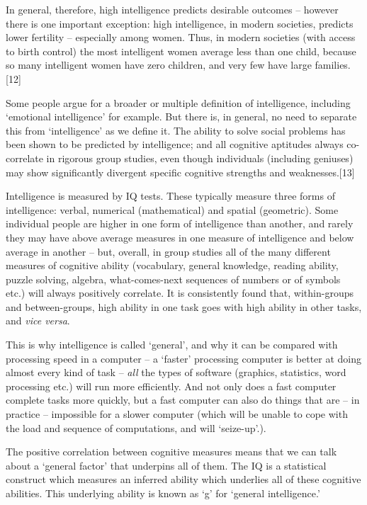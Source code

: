 \documentclass[
]{book}
\begin{document}
In general, therefore, high intelligence predicts desirable outcomes -- however there is one important exception: high intelligence, in modern societies, predicts lower fertility -- especially among women. Thus, in modern societies (with access to birth control) the most intelligent women average less than one child, because so many intelligent women have zero children, and very few have large families.{[}12{]}

Some people argue for a broader or multiple definition of intelligence, including `emotional intelligence' for example. But there is, in general, no need to separate this from `intelligence' as we define it. The ability to solve social problems has been shown to be predicted by intelligence; and all cognitive aptitudes always co-correlate in rigorous group studies, even though individuals (including geniuses) may show significantly divergent specific cognitive strengths and weaknesses.{[}13{]}

Intelligence is measured by IQ tests. These typically measure three forms of intelligence: verbal, numerical (mathematical) and spatial (geometric). Some individual people are higher in one form of intelligence than another, and rarely they may have above average measures in one measure of intelligence and below average in another -- but, overall, in group studies all of the many different measures of cognitive ability (vocabulary, general knowledge, reading ability, puzzle solving, algebra, what-comes-next sequences of numbers or of symbols etc.) will always positively correlate. It is consistently found that, within-groups and between-groups, high ability in one task goes with high ability in other tasks, and \emph{vice versa}.

This is why intelligence is called `general', and why it can be compared with processing speed in a computer -- a `faster' processing computer is better at doing almost every kind of task -- \emph{all} the types of software (graphics, statistics, word processing etc.) will run more efficiently. And not only does a fast computer complete tasks more quickly, but a fast computer can also do things that are -- in practice -- impossible for a slower computer (which will be unable to cope with the load and sequence of computations, and will `seize-up'.).

The positive correlation between cognitive measures means that we can talk about a `general factor' that underpins all of them. The IQ is a statistical construct which measures an inferred ability which underlies all of these cognitive abilities. This underlying ability is known as `g' for `general intelligence.'
\end{document}
